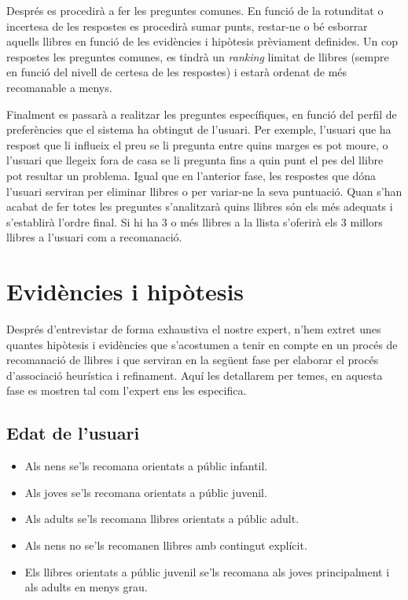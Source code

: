 Després es procedirà a fer les preguntes comunes. En funció de la rotunditat o incertesa de les respostes es procedirà sumar punts, restar-ne o bé esborrar aquells llibres en funció de les evidències i hipòtesis prèviament definides. Un cop respostes les preguntes comunes, es tindrà un \emph{ranking} limitat de llibres (sempre en funció del nivell de certesa de les respostes) i estarà ordenat de més recomanable a menys.

Finalment es passarà a realitzar les preguntes específiques, en funció del perfil de preferències que el sistema ha obtingut de l'usuari. Per exemple, l'usuari que ha respost que li influeix el preu se li pregunta entre quins marges es pot moure, o l'usuari que llegeix fora de casa se li pregunta fins a quin punt el pes del llibre pot resultar un problema. Igual que en l'anterior fase, les respostes que dóna l'usuari serviran per eliminar llibres o per variar-ne la seva puntuació. Quan s'han acabat de fer totes les preguntes s'analitzarà quins llibres són els més adequats i s'establirà l'ordre final. Si hi ha 3 o més llibres a la llista s'oferirà els 3 millors llibres a l'usuari com a recomanació.


\section{Evidències i hipòtesis}

Després d'entrevistar de forma exhaustiva el nostre expert, n'hem extret unes quantes hipòtesis i evidències que s'acostumen a tenir en compte en un procés de recomanació de llibres i que serviran en la següent fase per elaborar el procés d'associació heurística i refinament. Aquí les detallarem per temes, en aquesta fase es mostren tal com l'expert ens les especifica.

\subsection{Edat de l'usuari}
\begin{itemize}
  \item Als nens se'ls recomana orientats a públic infantil.
  \item Als joves se'ls recomana orientats a públic juvenil.  
  \item Als adults se'ls recomana llibres orientats a públic adult.
  \item Als nens no se'ls recomanen llibres amb contingut explícit.
  \item Els llibres orientats a públic juvenil se'ls recomana als joves principalment i als adults en menys grau.
\end{itemize}

